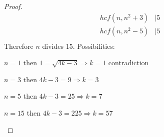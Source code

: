 \documentclass[]{article}
\theoremstyle{definition}
\theoremstyle{remark}
\numberwithin{equation}{section}
\begin{document}
\begin{proof}
					\begin{align*}
						hcf(n, n^2+3) &| 5\\
						hcf(n, n^2-5) &|5\\
					\end{align*}
					Therefore $n$ divides 15. Possibilities:
					\begin{description}
						\item{$n = 1$} then $1 = \sqrt{4k-3} \Rightarrow k = 1$ \underline{contradiction}
						\item{$n = 3$} then $4k-3 = 9 \Rightarrow k = 3$
						\item{$n = 5$} then $4k-3 = 25 \Rightarrow k = 7$
						\item{$n = 15$} then $4k-3 = 225 \Rightarrow k = 57$
					\end{description}
				\end{proof}
\end{document}
